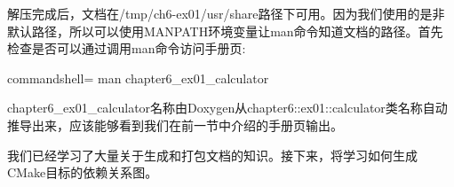 解压完成后，文档在/tmp/ch6-ex01/usr/share路径下可用。因为我们使用的是非默认路径，所以可以使用MANPATH环境变量让man命令知道文档的路径。首先检查是否可以通过调用man命令访问手册页:

\begin{tcblisting}{commandshell={}}
man chapter6_ex01_calculator
\end{tcblisting}

chapter6\_ex01\_calculator名称由Doxygen从chapter6::ex01::calculator类名称自动推导出来，应该能够看到我们在前一节中介绍的手册页输出。

我们已经学习了大量关于生成和打包文档的知识。接下来，将学习如何生成CMake目标的依赖关系图。



